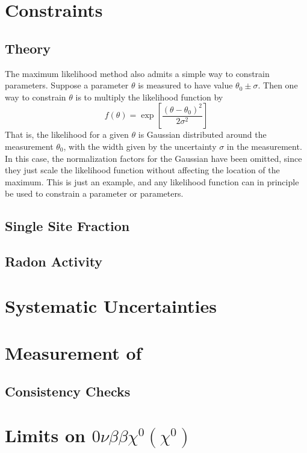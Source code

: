 \documentclass[herrin-thesis.tex]{subfiles}
\begin{document}
\section{Constraints}
\subsection{Theory}
The maximum likelihood method also admits a simple way to constrain parameters. Suppose a parameter \(\theta\) is measured to have value \(\theta_0 \pm \sigma\). Then one way to constrain \(\theta\) is to multiply the likelihood function by
\begin{equation}
f(\theta) = \exp\left[\frac{(\theta-\theta_0)^2}{2\sigma^2}\right]
\end{equation}
That is, the likelihood for a given \(\theta\) is Gaussian distributed around the measurement \(\theta_0\), with the width given by the uncertainty \(\sigma\) in the measurement. In this case, the normalization factors for the Gaussian have been omitted, since they just scale the likelihood function without affecting the location of the maximum. This is just an example, and any likelihood function can in principle be used to constrain a parameter or parameters.

\subsection{Single Site Fraction}

\subsection{Radon Activity}

\section{Systematic Uncertainties}

\section{Measurement of \twonu}

\subsection{Consistency Checks}

\section{Limits on \(0\nu\beta\beta\chi^0(\chi^0)\)}
\end{document}
